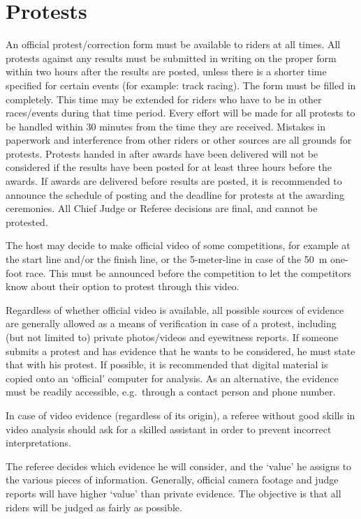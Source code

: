 \section{Protests}
An official protest/correction form must be available to riders at all times.
All protests against any results must be submitted in writing on the proper form within two hours after the results are posted, unless there is a shorter time specified for certain events (for example: track racing).
The form must be filled in completely.
This time may be extended for riders who have to be in other races/events during that time period.
Every effort will be made for all protests to be handled within 30 minutes from the time they are received.
Mistakes in paperwork and interference from other riders or other sources are all grounds for protests.
Protests handed in after awards have been delivered will not be considered if the results have been posted for at least three hours before the awards.
If awards are delivered before results are posted, it is recommended to announce the schedule of posting and the deadline for protests at the awarding ceremonies.
All Chief Judge or Referee decisions are final, and cannot be protested.

The host may decide to make official video of some competitions, for example at the start line and/or the finish line, or the 5-meter-line in case of the 50~m one-foot race.
This must be announced before the competition to let the competitors know about their option to protest through this video.

Regardless of whether official video is available, all possible sources of evidence are generally allowed as a means of verification in case of a protest, including (but not limited to) private photos/videos and eyewitness reports.
If someone submits a protest and has evidence that he wants to be considered, he must state that with his protest.
If possible, it is recommended that digital material is copied onto an `official' computer for analysis.
As an alternative, the evidence must be readily accessible, e.g.\ through a contact person and phone number.

In case of video evidence (regardless of its origin), a referee without good skills in video analysis should ask for a skilled assistant in order to prevent incorrect interpretations.

The referee decides which evidence he will consider, and the `value' he assigns to the various pieces of information.
Generally, official camera footage and judge reports will have higher `value' than private evidence.
The objective is that all riders will be judged as fairly as possible.

